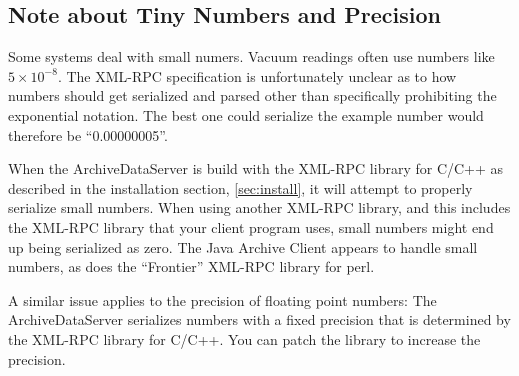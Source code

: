 \subsection{Note about Tiny Numbers and Precision} \label{sec:xml:tiny} %
Some systems deal with small numers. Vacuum readings often use numbers
like $5 \times 10^{-8}$. The XML-RPC specification is unfortunately
unclear as to how numbers should get serialized and parsed other than
specifically prohibiting the exponential notation. The best one could
serialize the example number would therefore be ``0.00000005''.

When the ArchiveDataServer is build with the XML-RPC library for C/C++
as described in the installation section, \ref{sec:install}, it will
attempt to properly serialize small numbers.  When using another
XML-RPC library, and this includes the XML-RPC library that your
client program uses, small numbers might end up being serialized as
zero. The Java Archive Client appears to handle small numbers, as does
the ``Frontier'' XML-RPC library for perl.

A similar issue applies to the precision of floating point numbers:
The ArchiveDataServer serializes numbers with a fixed precision that
is determined by the XML-RPC library for C/C++. You can patch the
library to increase the precision.

